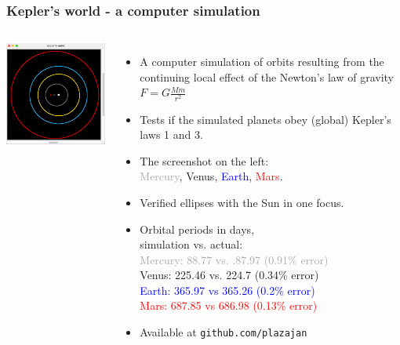 \documentclass[aspectratio=169,xcolor=pdftex,dvipsnames]{beamer} %
\begin{document}
\begin{frame}
\frametitle{Kepler's world - a computer simulation}



\begin{columns}
      \includegraphics[width=70mm]{keplersWorld.png}
   

\begin{itemize}
\item
A computer simulation of orbits resulting from the continuing local effect of the Newton's law of gravity $F = G\frac{M m}{r^2}$
\item
Tests if the simulated planets obey (global) Kepler's laws 1 and 3.
\item 
The screenshot on the left:\\ \textcolor{darkgray}{Mercury}, \textcolor{YellowOrange}{Venus}, 
\textcolor{blue}{Earth}, \textcolor{red}{Mars}.
\item
Verified ellipses with the Sun in one focus.
\item
Orbital periods in days,\\ simulation vs. actual:\\
\textcolor{darkgray}{Mercury: 88.77 vs. .87.97 (0.91\% error)}\\
\textcolor{YellowOrange}{Venus: 225.46 vs. 224.7 (0.34\% error)}\\
\textcolor{blue}{Earth: 365.97 vs 365.26 (0.2\% error)}\\
\textcolor{red}{Mars: 687.85 vs 686.98 (0.13\% error)}
\item
Available at \texttt{github.com/plazajan}
\end{itemize}
\end{columns} 

\end{frame}
\end{document}
